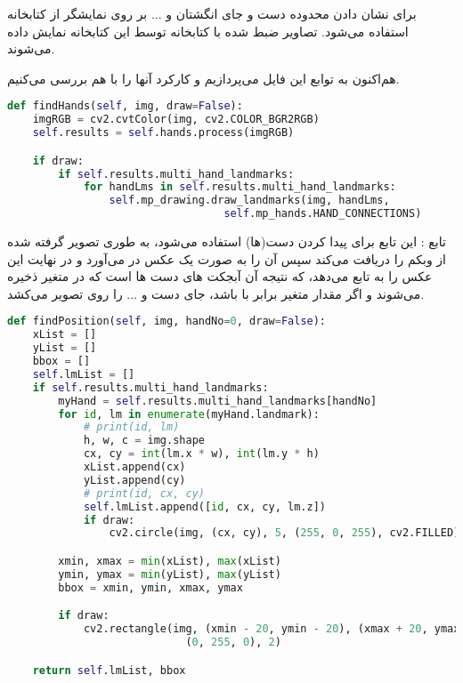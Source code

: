 \documentclass{article}
\begin{document}
برای نشان دادن محدوده دست و جای انگشتان و ... بر روی نمایشگر از کتابخانه  استفاده می‌شود. تصاویر ضبط شده با کتابخانه  توسط این کتابخانه نمایش داده می‌شوند. 
\cite{cv2}

هم‌اکنون به توابع این فایل می‌پردازیم و کارکرد آنها را با هم بررسی می‌کنیم.

\begin{latin}
\begin{lstlisting}[language=python]
def findHands(self, img, draw=False):
    imgRGB = cv2.cvtColor(img, cv2.COLOR_BGR2RGB)
    self.results = self.hands.process(imgRGB)

    if draw:
        if self.results.multi_hand_landmarks:
            for handLms in self.results.multi_hand_landmarks:
                self.mp_drawing.draw_landmarks(img, handLms,
                                  self.mp_hands.HAND_CONNECTIONS)
\end{lstlisting}
\end{latin}

تابع :
این تابع برای پیدا کردن دست(ها) استفاده می‌شود، به طوری تصویر گرفته شده از وبکم را دریافت می‌کند سپس آن را به صورت یک عکس  در می‌آورد و در نهایت این عکس را به تابع  می‌دهد، که نتیجه آن آبجکت های دست ها است که در متغیر  ذخیره می‌شوند و اگر مقدار متغیر  برابر با  باشد، جای دست و ... را روی تصویر می‌کشد.

\begin{latin}
\begin{lstlisting}[language=python]
def findPosition(self, img, handNo=0, draw=False):
    xList = []
    yList = []
    bbox = []
    self.lmList = []
    if self.results.multi_hand_landmarks:
        myHand = self.results.multi_hand_landmarks[handNo]
        for id, lm in enumerate(myHand.landmark):
            # print(id, lm)
            h, w, c = img.shape
            cx, cy = int(lm.x * w), int(lm.y * h)
            xList.append(cx)
            yList.append(cy)
            # print(id, cx, cy)
            self.lmList.append([id, cx, cy, lm.z])
            if draw:
                cv2.circle(img, (cx, cy), 5, (255, 0, 255), cv2.FILLED)

        xmin, xmax = min(xList), max(xList)
        ymin, ymax = min(yList), max(yList)
        bbox = xmin, ymin, xmax, ymax

        if draw:
            cv2.rectangle(img, (xmin - 20, ymin - 20), (xmax + 20, ymax + 20),
                            (0, 255, 0), 2)

    return self.lmList, bbox
\end{lstlisting}
\end{latin}
\end{document}
